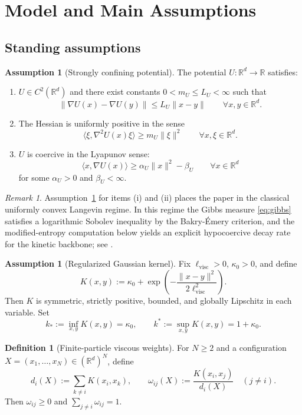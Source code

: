 \documentclass[11pt]{article}
\theoremstyle{definition}
\newtheorem{definition}[theorem]{Definition}
\newtheorem{assumption}[theorem]{Assumption}
\theoremstyle{remark}
\newtheorem{remark}[theorem]{Remark}
\newcommand{\R}{\mathbb{R}}
\begin{document}
\section{Model and Main Assumptions}

\subsection{Standing assumptions}

\begin{assumption}[Strongly confining potential]\label{ass:potential}
The potential $U:\R^d\to\R$ satisfies:
\begin{enumerate}[label=\textnormal{(\roman*)},leftmargin=1.5em]
\item $U\in C^2(\R^d)$ and there exist constants $0<m_U\leq L_U<\infty$ such
that
\[
\|\nabla U(x)-\nabla U(y)\|\leq L_U\|x-y\|
\qquad
\forall x,y\in\R^d.
\]
\item The Hessian is uniformly positive in the sense
\[
\langle \xi,\nabla^2 U(x)\xi\rangle\geq m_U\|\xi\|^2
\qquad
\forall x,\xi\in\R^d.
\]
\item $U$ is coercive in the Lyapunov sense:
\[
\langle x,\nabla U(x)\rangle \geq \alpha_U\|x\|^2-\beta_U
\qquad
\forall x\in\R^d
\]
for some $\alpha_U>0$ and $\beta_U<\infty$.
\end{enumerate}
\end{assumption}

\begin{remark}
Assumption~\ref{ass:potential} for items \textnormal{(i)} and \textnormal{(ii)}
places the paper in the classical
uniformly convex Langevin regime. In this regime the Gibbs measure
\eqref{eq:gibbs} satisfies a logarithmic Sobolev inequality by the
Bakry-\'Emery criterion, and the modified-entropy computation below yields an
explicit hypocoercive decay rate for the kinetic backbone; see
\cite{bakry1985diffusions,villani2009hypocoercivity}.
\end{remark}

\begin{assumption}[Regularized Gaussian kernel]\label{ass:kernel}
Fix $\ell_{\mathrm{visc}}>0$, $\kappa_0>0$, and define
\[
K(x,y):=\kappa_0+\exp\!\left(-\frac{\|x-y\|^2}{2\ell_{\mathrm{visc}}^2}\right).
\]
Then $K$ is symmetric, strictly positive, bounded, and globally Lipschitz in
each variable. Set
\[
k_*:=\inf_{x,y}K(x,y)=\kappa_0,
\qquad
k^*:=\sup_{x,y}K(x,y)=1+\kappa_0.
\]
\end{assumption}

\begin{definition}[Finite-particle viscous weights]\label{def:weights}
For $N\geq2$ and a configuration $X=(x_1,\dots,x_N)\in(\R^d)^N$, define
\[
d_i(X):=\sum_{k\neq i}K(x_i,x_k),
\qquad
\omega_{ij}(X):=\frac{K(x_i,x_j)}{d_i(X)}
\quad(j\neq i).
\]
Then $\omega_{ij}\geq0$ and $\sum_{j\neq i}\omega_{ij}=1$.
\end{definition}
\end{document}
